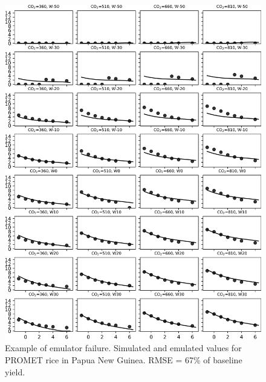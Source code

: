 \documentclass[10pt]{article}
\begin{document}
\begin{figure}[h!]
\includegraphics[width=\textwidth]{promet_rice_bad.png}
\caption{Example of emulator failure. Simulated and emulated values for PROMET rice in Papua New Guinea. RMSE = 67\% of baseline yield.}
\label{fig:lpjmlrice}
\end{figure}
\end{document}
